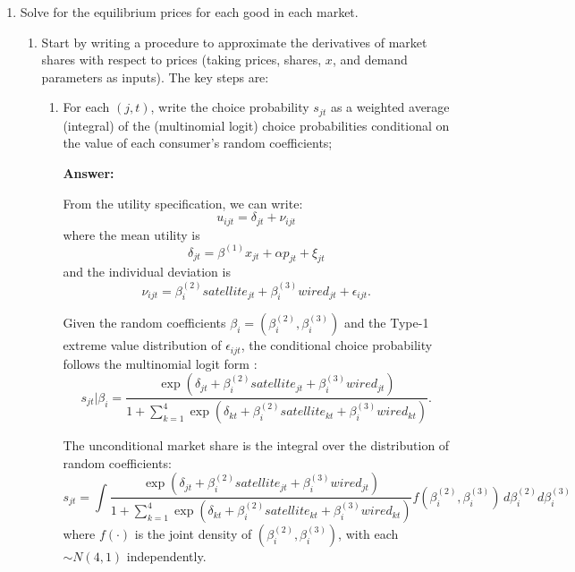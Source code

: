 \documentclass[english,11pt]{article}
\begin{document}
\begin{enumerate}
\item Solve for the equilibrium prices for each good in each market.

\begin{enumerate}
\item Start by writing a procedure to approximate the derivatives of market
shares with respect to prices (taking prices, shares, $x$, and demand
parameters as inputs). The key steps are:
\begin{enumerate}
\item For each $(j,t)$, write the choice probability $s_{jt}$ as a weighted
average (integral) of the (multinomial logit) choice probabilities
conditional on the value of each consumer's random coefficients; 

\textbf{Answer:}

From the utility specification, we can write:
\begin{equation*}
u_{ijt} = \delta_{jt} + \nu_{ijt}
\end{equation*}
where the mean utility is
\begin{equation*}
\delta_{jt} = \beta^{(1)}x_{jt} + \alpha p_{jt} + \xi_{jt}
\end{equation*}
and the individual deviation is
\begin{equation*}
\nu_{ijt} = \beta_i^{(2)}satellite_{jt} + \beta_i^{(3)}wired_{jt} + \epsilon_{ijt}.
\end{equation*}

Given the random coefficients $\beta_i = (\beta_i^{(2)}, \beta_i^{(3)})$ and the Type-1 extreme value distribution of $\epsilon_{ijt}$, the conditional choice probability follows the multinomial logit form \citep{berry1995automobile}:
\begin{equation*}
s_{jt}|\beta_i = \frac{\exp(\delta_{jt} + \beta_i^{(2)}satellite_{jt} + \beta_i^{(3)}wired_{jt})}{1 + \sum_{k=1}^4 \exp(\delta_{kt} + \beta_i^{(2)}satellite_{kt} + \beta_i^{(3)}wired_{kt})}.
\end{equation*}

The unconditional market share is the integral over the distribution of random coefficients:
\begin{equation*}
s_{jt} = \int \frac{\exp(\delta_{jt} + \beta_i^{(2)}satellite_{jt} + \beta_i^{(3)}wired_{jt})}{1 + \sum_{k=1}^4 \exp(\delta_{kt} + \beta_i^{(2)}satellite_{kt} + \beta_i^{(3)}wired_{kt})} f(\beta_i^{(2)}, \beta_i^{(3)}) \, d\beta_i^{(2)} d\beta_i^{(3)}
\end{equation*}
where $f(\cdot)$ is the joint density of $(\beta_i^{(2)}, \beta_i^{(3)})$, with each $\sim N(4,1)$ independently.



\end{enumerate}
\end{enumerate}
\end{enumerate}
\end{document}
